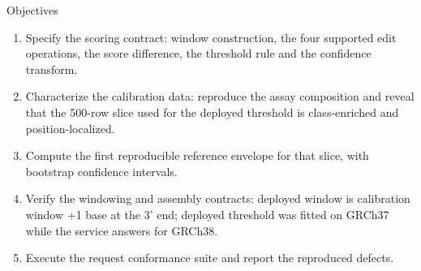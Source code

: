 \documentclass[aspectratio=169,10pt]{beamer}
\begin{document}
\begin{frame}{Objectives}
\begin{enumerate}
\item Specify the scoring contract: window construction, the four supported edit operations, the score difference, the threshold rule and the confidence transform.
\item Characterize the calibration data: reproduce the assay composition and reveal that the 500-row slice used for the deployed threshold is class-enriched and position-localized.
\item Compute the first reproducible reference envelope for that slice, with bootstrap confidence intervals.
\item Verify the windowing and assembly contracts: deployed window is calibration window +1 base at the 3' end; deployed threshold was fitted on GRCh37 while the service answers for GRCh38.
\item Execute the request conformance suite and report the reproduced defects.
\end{enumerate}
\end{frame}
\end{document}
